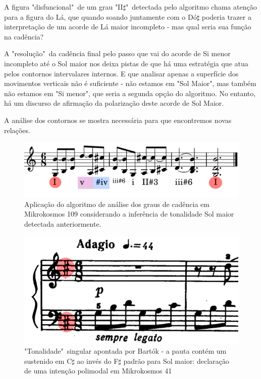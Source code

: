 \documentclass[
	12pt,				%
	openright,			%
	twoside,			%
	a4paper,			%
	english,			%
	french,				%
	spanish,			%
	brazil				%
	]{abntex2}
\begin{document}
A figura "disfuncional"\ de um grau "II$\sharp$"\ detectada pelo algoritmo chama atenção para a figura do Lá, que quando soando juntamente com o Dó$\sharp$ poderia trazer a interpretação de um acorde de Lá maior incompleto - mas qual seria sua função na cadência? 

A "resolução"\ da cadência final pelo passo que vai do acorde de Si menor incompleto até o Sol maior nos deixa pistas de que há uma estratégia que atua pelos contornos intervalares internos. E que analisar apenas a superfície dos movimentos verticais não é suficiente - não estamos em "Sol Maior", mas também não estamos em "Si menor", que seria a segunda opção do algoritmo. No entanto, há um discurso de afirmação da polarização deste acorde de Sol Maior.

A análise dos contornos se mostra necessária para que encontremos novas relações. 

\begin{figure}[!h]
	\caption{\label{fig_grafico} Aplicação do algoritmo de análise dos graus de cadência em Mikrokosmos 109 considerando a inferência de tonalidade Sol maior detectada anteriormente.} 
	\begin{center}
	    \includegraphics[scale=0.25]{estudosM21/mikro041FinalChords.png}
	\end{center}
\end{figure}



\begin{figure}[!h]
	\caption{\label{fig_grafico} "Tonalidade"\ singular apontada por Bartók - a pauta contém um sustenido em C$\sharp$ ao invés do F$\sharp$ padrão para Sol maior: declaração de uma intenção polimodal em Mikrokosmos 41} 
	\begin{center}
	    \includegraphics[scale=0.4]{estudosM21/mikro041_inicio.png}
	\end{center}
\end{figure}
\end{document}
